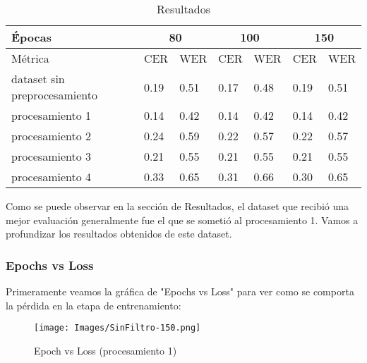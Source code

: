 \documentclass{article}
\begin{document}
\begin{table}[H]
\begin{center}
\begin{tabular}{|l|ll|ll|ll|}
\hline
\'Épocas           & \multicolumn{2}{c|}{80}  & \multicolumn{2}{c|}{100} & \multicolumn{2}{c|}{150} \\ \hline
Métrica                      & \multicolumn{1}{l|}{CER} & WER & \multicolumn{1}{l|}{CER} & WER & \multicolumn{1}{l|}{CER} & WER \\ \hline
dataset sin preprocesamiento & \multicolumn{1}{l|}{0.19}    &  0.51   & \multicolumn{1}{l|}{0.17}    &  0.48   & \multicolumn{1}{l|}{0.19}    &  0.51   \\ \hline
procesamiento 1 & \multicolumn{1}{l|}{0.14} & 0.42  & \multicolumn{1}{l|}{0.14} & 0.42 & \multicolumn{1}{l|}{0.14} &0.42  \\ \hline
procesamiento 2 & \multicolumn{1}{l|}{0.24} &0.59  & \multicolumn{1}{l|}{0.22} &0.57  & \multicolumn{1}{l|}{0.22} & 0.57 \\ \hline
procesamiento 3 & \multicolumn{1}{l|}{0.21} & 0.55 & \multicolumn{1}{l|}{0.21} &  0.55 & \multicolumn{1}{l|}{0.21} & 0.55 \\ \hline
procesamiento 4 & \multicolumn{1}{l|}{0.33} & 0.65 & \multicolumn{1}{l|}{0.31} & 0.66 & \multicolumn{1}{l|}{0.30} & 0.65  \\ \hline
\end{tabular}
\end{center}
\caption{Resultados}
\end{table}

Como se puede observar en la sección de Resultados, el dataset que recibió una mejor evaluación generalmente fue el que se sometió al procesamiento 1.
Vamos a profundizar los resultados obtenidos de este dataset.

\subsubsection{Epochs vs Loss}
Primeramente veamos la gráfica de "Epochs vs Loss" para ver como se comporta la pérdida en la etapa de entrenamiento:

\begin{figure}[H]
    \centering
    \texttt{[image: Images/SinFiltro-150.png]}
    \caption{Epoch vs Loss (procesamiento 1)}
    \label{fig:25}
\end{figure}
\end{document}
